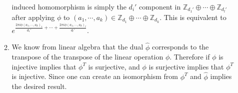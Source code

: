 \documentclass[12pt, letterpaper]{article}
\newcommand{\Z}{\mathbb{Z}}
\begin{document}
\begin{enumerate}
\begin{enumerate}
		induced homomorphism is simply the $d_i'$ component in  $\Z_{d_1'} \oplus \cdots \oplus \Z_{d_l'}$
		after applying $\phi$ to $(a_1,\cdots, a_k) \in \Z_{d_1} \oplus \cdots \oplus \Z_{d_k}$.  
		This is equivalent to $e^{\frac{2 \pi i \phi(a_1,\cdots, a_k)_1}{d_1'} + \cdots + \frac{2 \pi i \phi(a_1,\cdots, a_k)_l}{d_l'}}$.  
		\item We know from linear algebra that the dual $\hat{\phi}$ corresponds to the transpose of the transpose
		of the linear operation $\phi$.  Therefore if $\phi$ is injective implies that $\phi^T$ is surjective, 
		and $\phi$ is surjective implies that $\phi^T$ is injective.  Since one can create an isomorphism 
		from $\phi^T$ and $\hat{\phi}$ implies the desired result.  
		
	\end{enumerate}
	
\end{enumerate}
\end{document}
